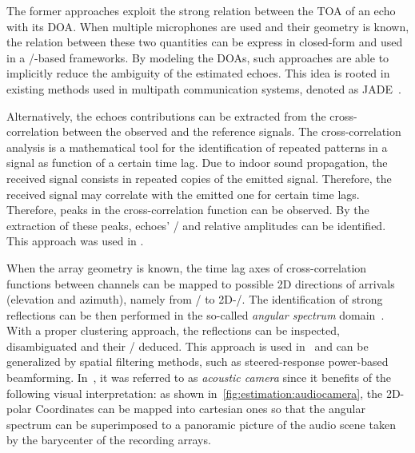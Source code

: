 \mynewline
The former approaches exploit the strong relation between the \ac{TOA} of an echo with its \ac{DOA}.
When multiple microphones are used and their geometry is known, the relation between these two quantities can be express in closed-form and used in a \ML/-based frameworks.
By modeling the \ac{DOA}s, such approaches are able to implicitly reduce the ambiguity of the estimated echoes.
This idea is rooted in existing methods used in multipath communication systems, denoted as \ac{JADE}~.

\mynewline
Alternatively, the echoes contributions can be extracted from the cross-correlation between the observed and the reference signals.
The cross-correlation analysis is a mathematical tool for the identification of repeated patterns in a signal as function of a certain time lag.
Due to indoor sound propagation, the received signal consists in repeated copies of the emitted signal.
Therefore, the received signal may correlate with the emitted one for certain time lags.
Therefore, peaks in the cross-correlation function can be observed.
By the extraction of these peaks, echoes' \TOAs/ and relative amplitudes can be identified.
This approach was used in .

When the array geometry is known, the time lag axes of cross-correlation functions between channels can be mapped to possible 2D directions of arrivals (elevation and azimuth), namely from \TOAs/ to 2D-\DOAs/.
The identification of strong reflections can be then performed in the so-called \textit{angular spectrum} domain~.
With a proper clustering approach, the reflections can be inspected, disambiguated and their \TOAs/ deduced.
This approach is used in~ and can be generalized by spatial filtering methods, such as steered-response power-based beamforming.
In~, it was referred to as \textit{acoustic camera} since it benefits of the following visual interpretation:
as shown in~\cref{fig:estimation:audiocamera}, the 2D-polar Coordinates can be mapped into cartesian ones so that the angular spectrum can be superimposed to a panoramic picture of the audio scene taken by the barycenter of the recording arrays.

